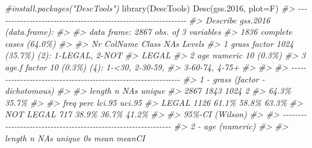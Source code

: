 \documentclass[
]{book}
\newenvironment{Shaded}{\begin{snugshade}}{\end{snugshade}}
\newcommand{\AttributeTok}[1]{\textcolor[rgb]{0.77,0.63,0.00}{#1}}
\newcommand{\CommentTok}[1]{\textcolor[rgb]{0.56,0.35,0.01}{\textit{#1}}}
\newcommand{\FloatTok}[1]{\textcolor[rgb]{0.00,0.00,0.81}{#1}}
\newcommand{\FunctionTok}[1]{\textcolor[rgb]{0.00,0.00,0.00}{#1}}
\newcommand{\NormalTok}[1]{#1}
\begin{document}
\begin{Shaded}
\begin{Highlighting}[]
\CommentTok{\#install.packages("DescTools")}
\FunctionTok{library}\NormalTok{(DescTools)}
\FunctionTok{Desc}\NormalTok{(gss}\FloatTok{.2016}\NormalTok{, }\AttributeTok{plot=}\NormalTok{F)}
\CommentTok{\#\textgreater{} {-}{-}{-}{-}{-}{-}{-}{-}{-}{-}{-}{-}{-}{-}{-}{-}{-}{-}{-}{-}{-}{-}{-}{-}{-}{-}{-}{-}{-}{-}{-}{-}{-}{-}{-}{-}{-}{-}{-}{-}{-}{-}{-}{-}{-}{-}{-}{-}{-}{-}{-}{-}{-}{-}{-}{-}{-}{-}{-}{-}{-}{-}{-} }
\CommentTok{\#\textgreater{} Describe gss.2016 (data.frame):}
\CommentTok{\#\textgreater{} }
\CommentTok{\#\textgreater{} data frame:  2867 obs. of  3 variables}
\CommentTok{\#\textgreater{}      1836 complete cases (64.0\%)}
\CommentTok{\#\textgreater{} }
\CommentTok{\#\textgreater{}   Nr  ColName  Class    NAs           Levels              }
\CommentTok{\#\textgreater{}   1   grass    factor   1024 (35.7\%)  (2): 1{-}LEGAL, 2{-}NOT }
\CommentTok{\#\textgreater{}                                       LEGAL               }
\CommentTok{\#\textgreater{}   2   age      numeric    10 (0.3\%)                       }
\CommentTok{\#\textgreater{}   3   age.f    factor     10 (0.3\%)   (4): 1{-}\textless{}30, 2{-}30{-}59,}
\CommentTok{\#\textgreater{}                                       3{-}60{-}74, 4{-}75+      }
\CommentTok{\#\textgreater{} }
\CommentTok{\#\textgreater{} }
\CommentTok{\#\textgreater{} {-}{-}{-}{-}{-}{-}{-}{-}{-}{-}{-}{-}{-}{-}{-}{-}{-}{-}{-}{-}{-}{-}{-}{-}{-}{-}{-}{-}{-}{-}{-}{-}{-}{-}{-}{-}{-}{-}{-}{-}{-}{-}{-}{-}{-}{-}{-}{-}{-}{-}{-}{-}{-}{-}{-}{-}{-}{-}{-}{-}{-}{-}{-} }
\CommentTok{\#\textgreater{} 1 {-} grass (factor {-} dichotomous)}
\CommentTok{\#\textgreater{} }
\CommentTok{\#\textgreater{}   length      n    NAs unique}
\CommentTok{\#\textgreater{}    2\textquotesingle{}867  1\textquotesingle{}843  1\textquotesingle{}024      2}
\CommentTok{\#\textgreater{}           64.3\%  35.7\%       }
\CommentTok{\#\textgreater{} }
\CommentTok{\#\textgreater{}             freq   perc  lci.95  uci.95\textquotesingle{}}
\CommentTok{\#\textgreater{} LEGAL      1\textquotesingle{}126  61.1\%   58.8\%   63.3\%}
\CommentTok{\#\textgreater{} NOT LEGAL    717  38.9\%   36.7\%   41.2\%}
\CommentTok{\#\textgreater{} }
\CommentTok{\#\textgreater{} \textquotesingle{} 95\%{-}CI (Wilson)}
\CommentTok{\#\textgreater{} }
\CommentTok{\#\textgreater{} {-}{-}{-}{-}{-}{-}{-}{-}{-}{-}{-}{-}{-}{-}{-}{-}{-}{-}{-}{-}{-}{-}{-}{-}{-}{-}{-}{-}{-}{-}{-}{-}{-}{-}{-}{-}{-}{-}{-}{-}{-}{-}{-}{-}{-}{-}{-}{-}{-}{-}{-}{-}{-}{-}{-}{-}{-}{-}{-}{-}{-}{-}{-} }
\CommentTok{\#\textgreater{} 2 {-} age (numeric)}
\CommentTok{\#\textgreater{} }
\CommentTok{\#\textgreater{}   length      n    NAs  unique     0s   mean  meanCI\textquotesingle{}}

\end{Highlighting}
\end{Shaded}
\end{document}
